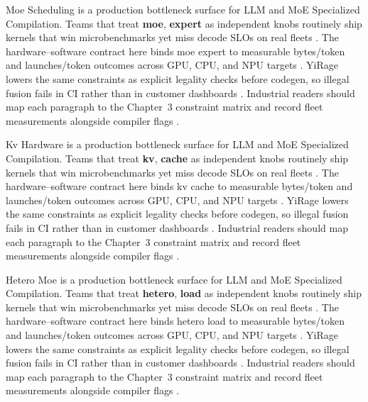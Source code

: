 Moe Scheduling is a production bottleneck surface for LLM and MoE Specialized Compilation. Teams that treat \textbf{moe}, \textbf{expert} as independent knobs routinely ship kernels that win microbenchmarks yet miss decode SLOs on real fleets \citep{amd2024xdna,dao2022flashattention}. The hardware--software contract here binds moe expert to measurable bytes/token and launches/token outcomes across GPU, CPU, and NPU targets \citep{amd2024aie,kwon2023vllm}. YiRage lowers the same constraints as explicit legality checks before codegen, so illegal fusion fails in CI rather than in customer dashboards \citep{dlbook,nvidia2024cudagraphs}. Industrial readers should map each paragraph to the Chapter~3 constraint matrix and record fleet measurements alongside compiler flags \citep{dao2022flashattention,liu2024deepseekv3}.

Kv Hardware is a production bottleneck surface for LLM and MoE Specialized Compilation. Teams that treat \textbf{kv}, \textbf{cache} as independent knobs routinely ship kernels that win microbenchmarks yet miss decode SLOs on real fleets \citep{amd2024aie,kwon2023vllm}. The hardware--software contract here binds kv cache to measurable bytes/token and launches/token outcomes across GPU, CPU, and NPU targets \citep{dlbook,nvidia2024cudagraphs}. YiRage lowers the same constraints as explicit legality checks before codegen, so illegal fusion fails in CI rather than in customer dashboards \citep{dao2022flashattention,liu2024deepseekv3}. Industrial readers should map each paragraph to the Chapter~3 constraint matrix and record fleet measurements alongside compiler flags \citep{kwon2023vllm,patel2025llminference}.

Hetero Moe is a production bottleneck surface for LLM and MoE Specialized Compilation. Teams that treat \textbf{hetero}, \textbf{load} as independent knobs routinely ship kernels that win microbenchmarks yet miss decode SLOs on real fleets \citep{dlbook,nvidia2024cudagraphs}. The hardware--software contract here binds hetero load to measurable bytes/token and launches/token outcomes across GPU, CPU, and NPU targets \citep{dao2022flashattention,liu2024deepseekv3}. YiRage lowers the same constraints as explicit legality checks before codegen, so illegal fusion fails in CI rather than in customer dashboards \citep{kwon2023vllm,patel2025llminference}. Industrial readers should map each paragraph to the Chapter~3 constraint matrix and record fleet measurements alongside compiler flags \citep{nvidia2024cudagraphs,taxbreak2026}.

